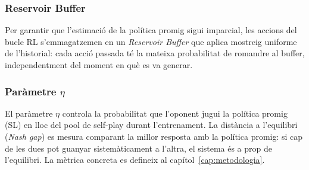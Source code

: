 \subsubsection*{Reservoir Buffer}

Per garantir que l'estimació de la política promig sigui imparcial, les accions
del bucle RL s'emmagatzemen en un \emph{Reservoir Buffer} que aplica mostreig
uniforme de l'historial: cada acció passada té la mateixa probabilitat de
romandre al buffer, independentment del moment en què es va generar.

\subsubsection*{Paràmetre $\eta$}

El paràmetre $\eta$ controla la probabilitat que l'oponent jugui la política
promig (SL) en lloc del pool de self-play durant l'entrenament. La distància a
l'equilibri (\emph{Nash gap}) es mesura comparant la millor resposta amb la
política promig: si cap de les dues pot guanyar sistemàticament a l'altra, el
sistema és a prop de l'equilibri. La mètrica concreta es defineix al
capítol~\ref{cap:metodologia}.
